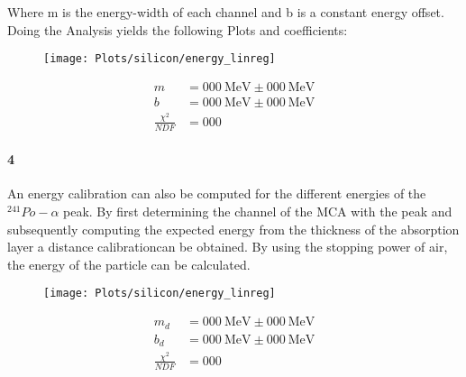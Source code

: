 \documentclass[12pt,twoside,a4paper]{scrartcl}
\begin{document}
			Where m is the energy-width of each channel and b is a constant energy offset.
			Doing the Analysis yields the following Plots and coefficients:

			\begin{figure}[H]
					\begin{minipage}{0.69 \textwidth}
						\texttt{[image: Plots/silicon/energy\_linreg]}
					\end{minipage}
					\begin{minipage}{0.29 \textwidth}
						\begin{align*}
							m &= \SI{000}{\mega \electronvolt} \pm \SI{000}{\mega \electronvolt} \\
							b &= \SI{000}{\mega \electronvolt} \pm \SI{000}{\mega \electronvolt} \\
							\frac{\chi^2}{NDF} &= 000
						\end{align*}
					\end{minipage}
				\end{figure}

		\paragraph{4}

			An energy calibration can also be computed for the different energies of the $^{241}Po-\alpha$ peak. By first determining the channel of the MCA with the peak and subsequently computing the expected energy from the thickness of the absorption layer a distance calibrationcan be obtained. By using the stopping power of air, the energy of the particle can be calculated.

			\begin{figure}[H]
					\begin{minipage}{0.69 \textwidth}
						\texttt{[image: Plots/silicon/energy\_linreg]}
					\end{minipage}
					\begin{minipage}{0.29 \textwidth}
						\begin{align*}
							m_d &= \SI{000}{\mega \electronvolt} \pm \SI{000}{\mega \electronvolt} \\
							b_d &= \SI{000}{\mega \electronvolt} \pm \SI{000}{\mega \electronvolt} \\
							\frac{\chi^2}{NDF} &= 000
						\end{align*}
					\end{minipage}
				\end{figure}
\end{document}
